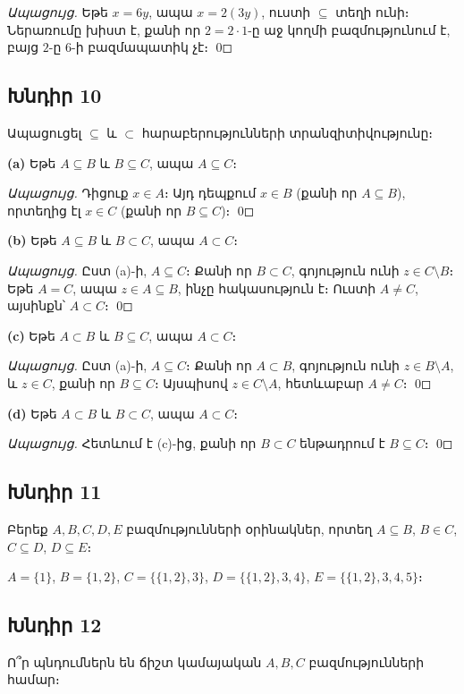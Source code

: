 \textit{Ապացույց.} Եթե $x = 6y$, ապա $x = 2(3y)$, ուստի $\subseteq$ տեղի ունի։ Ներառումը խիստ է, քանի որ $2 = 2 \cdot 1$-ը աջ կողմի բազմությունում է, բայց $2$-ը 6-ի բազմապատիկ չէ։ \qed

\subsection*{Խնդիր 10}
Ապացուցել $\subseteq$ և $\subset$ հարաբերությունների տրանզիտիվությունը։

\textbf{(a)} Եթե $A \subseteq B$ և $B \subseteq C$, ապա $A \subseteq C$։

\textit{Ապացույց.} Դիցուք $x \in A$։ Այդ դեպքում $x \in B$ (քանի որ $A \subseteq B$), որտեղից էլ $x \in C$ (քանի որ $B \subseteq C$)։ \qed

\textbf{(b)} Եթե $A \subseteq B$ և $B \subset C$, ապա $A \subset C$։

\textit{Ապացույց.} Ըստ (a)-ի, $A \subseteq C$։ Քանի որ $B \subset C$, գոյություն ունի $z \in C \setminus B$։ Եթե $A = C$, ապա $z \in A \subseteq B$, ինչը հակասություն է։ Ուստի $A \neq C$, այսինքն՝ $A \subset C$։ \qed

\textbf{(c)} Եթե $A \subset B$ և $B \subseteq C$, ապա $A \subset C$։

\textit{Ապացույց.} Ըստ (a)-ի, $A \subseteq C$։ Քանի որ $A \subset B$, գոյություն ունի $z \in B \setminus A$, և $z \in C$, քանի որ $B \subseteq C$։ Այսպիսով $z \in C \setminus A$, հետևաբար $A \neq C$։ \qed

\textbf{(d)} Եթե $A \subset B$ և $B \subset C$, ապա $A \subset C$։

\textit{Ապացույց.} Հետևում է (c)-ից, քանի որ $B \subset C$ ենթադրում է $B \subseteq C$։ \qed

\subsection*{Խնդիր 11}
Բերեք $A, B, C, D, E$ բազմությունների օրինակներ, որտեղ $A \subseteq B$, $B \in C$, $C \subseteq D$, $D \subseteq E$։

$A = \{1\}$, $B = \{1,2\}$, $C = \{\{1,2\},3\}$, $D = \{\{1,2\},3,4\}$, $E = \{\{1,2\},3,4,5\}$։

\subsection*{Խնդիր 12}
Ո՞ր պնդումներն են ճիշտ կամայական $A, B, C$ բազմությունների համար։

